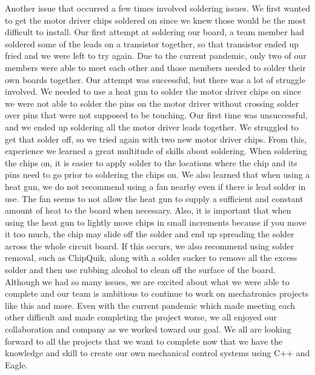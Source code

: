  Another issue that occurred a few times involved soldering issues. We first wanted to get the motor driver chips soldered on since we knew those would be the most difficult to install. Our first attempt at soldering our board, a team member had soldered some of the leads on a transistor together, so that transistor ended up fried and we were left to try again. Due to the current pandemic, only two of our members were able to meet each other and those members needed to solder their own boards together. Our attempt was successful, but there was a lot of struggle involved. We needed to use a heat gun to solder the motor driver chips on since we were not able to solder the pins on the motor driver without crossing solder over pins that were not supposed to be touching. Our first time was unsuccessful, and we ended up soldering all the motor driver leads together. We struggled to get that solder off, so we tried again with two new motor driver chips. From this, experience we learned a great multitude of skills about soldering. When soldering the chips on, it is easier to apply solder to the locations where the chip and its pins need to go prior to soldering the chips on. We also learned that when using a heat gun, we do not recommend using a fan nearby even if there is lead solder in use. The fan seems to not allow the heat gun to supply a sufficient and constant amount of heat to the board when necessary. Also, it is important that when using the heat gun to lightly move chips in small increments because if you move it too much, the chip may slide off the solder and end up spreading the solder across the whole circuit board. If this occurs, we also recommend using solder removal, such as Chip\+Quik, along with a solder sucker to remove all the excess solder and then use rubbing alcohol to clean off the surface of the board. ~\newline
 ~\newline
 Although we had so many issues, we are excited about what we were able to complete and our team is ambitious to continue to work on mechatronics projects like this and more. Even with the current pandemic which made meeting each other difficult and made completing the project worse, we all enjoyed our collaboration and company as we worked toward our goal. We all are looking forward to all the projects that we want to complete now that we have the knowledge and skill to create our own mechanical control systems using C++ and Eagle. ~\newline
 ~\newline
  ~\newline
